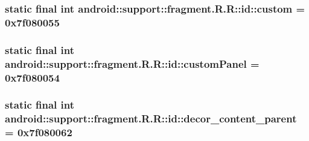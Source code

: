 \hypertarget{classandroid_1_1support_1_1fragment_1_1_r_1_1id_73582f4dd01f2961c4c8e3e3701de034}{
\subsubsection[{custom}]{\setlength{\rightskip}{0pt plus 5cm}static final int android::support::fragment.R.R::id::custom = 0x7f080055}}
\label{classandroid_1_1support_1_1fragment_1_1_r_1_1id_73582f4dd01f2961c4c8e3e3701de034}


\hypertarget{classandroid_1_1support_1_1fragment_1_1_r_1_1id_08ec132620f954e9be2bce0095df2611}{
\subsubsection[{customPanel}]{\setlength{\rightskip}{0pt plus 5cm}static final int android::support::fragment.R.R::id::customPanel = 0x7f080054}}
\label{classandroid_1_1support_1_1fragment_1_1_r_1_1id_08ec132620f954e9be2bce0095df2611}


\hypertarget{classandroid_1_1support_1_1fragment_1_1_r_1_1id_f61f7ad08037d48ea06fcd79837baf15}{
\subsubsection[{decor\_\-content\_\-parent}]{\setlength{\rightskip}{0pt plus 5cm}static final int android::support::fragment.R.R::id::decor\_\-content\_\-parent = 0x7f080062}}
\label{classandroid_1_1support_1_1fragment_1_1_r_1_1id_f61f7ad08037d48ea06fcd79837baf15}


